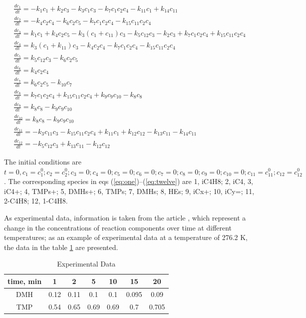 \documentclass{svproc}
\begin{document}
\begin{gather}
  \frac{dc_1}{dt} = -k_1c_1 + k_2c_3 - k_3c_1c_3 - k_7c_1c_2c_4 - k_{11}c_1 + k_{14}c_{11} \label{eq:one} \\
  \frac{dc_2}{dt} = -k_4c_2c_4 - k_6c_2c_5 - k_7c_1c_2c_4 - k_{15}c_{11}c_2c_4 \label{eq:two} \\
  \frac{dc_3}{dt} = k_1c_1 + k_4c_2c_5 - k_3(c_1 + c_{11})c_3 - k_{5}c_{12}c_3 - k_2c_3 + k_7c_1c_2c_4 + k_{15}c_{11}c_2c_4 \label{eq:three} \\
  \frac{dc_4}{dt} = k_3(c_1 + k_{11})c_3 - k_4c_2c_4 - k_{7}c_{1}c_2c_4 - k_{15}c_{11}c_2c_4 \label{eq:four} \\
  \frac{dc_5}{dt} = k_5c_{12}c_3 - k_{6}c_2c_5 \label{eq:five} \\
  \frac{dc_6}{dt} = k_4c_{2}c_4 \label{eq:six} \\
  \frac{dc_7}{dt} = k_6c_{2}c_5 - k_{10}c_7 \label{eq:seven} \\
  \frac{dc_8}{dt} = k_7c_{1}c_2c_4 + k_{15}c_{11}c_2c_4 + k_9c_9c_{10} - k_8c_8 \label{eq:eight} \\
  \frac{dc_9}{dt} = k_8c_{8} - k_{9}c_{9}c_{10} \label{eq:nine} \\
  \frac{dc_{10}}{dt} = k_8c_{8} - k_{9}c_{9}c_{10} \label{eq:ten} \\
  \frac{dc_{11}}{dt} = -k_3c_{11}c_3 - k_{15}c_{11}c_{2}c_4 + k_{11}c_1 + k_{12}c_{12} - k_{13}c_{11} - k_{14}c_{11} \label{eq:eleven} \\
  \frac{dc_{12}}{dt} = -k_5c_{12}c_3 + k_{13}c_{11} - k_{12}c_{12} \label{eq:twelve} 
\end{gather}

The initial conditions are $t = 0, c_1 = c_1^0; c_2=c_2^0; c_3 = 0; c_4 = 0; c_5= 0; c_6 = 0; c_7 = 0; c_8 = 0; c_9 = 0; c_{10} = 0; c_{11}=c_{11}^0; c_{12} = c_{12}^0$.
The corresponding species in eqs (\ref{eq:one})--(\ref{eq:twelve}) are 1, iC4H8; 2, iC4, 3, iC4+; 4, TMPs+; 5, DMHs+; 6, TMPs; 7, DMHs; 8, HEs; 9, iCx+; 10, iCy=; 11, 2-C4H8; 12, 1-C4H8.

As experimental data, information is taken from the article \cite{cao2019}, which represent a change in the concentrations of reaction components over time at different temperatures; as an example of experimental data at a temperature of 276.2 K, the data in the table \ref{table1} are presented.

\begin{table}
\label{table1}
\caption{Experimental Data}
\begin{center}
\begin{tabular}{ccccccc}
\hline
time, min & 1 & 2 & 5 & 10 & 15 & 20 \\
\hline\rule{0pt}{12pt}
DMH & 0.12 & 0.11 & 0.1	& 0.1 &	0.095 &	0.09  \\
TMP & 0.54 & 0.65 & 0.69 & 0.69 & 0.7 & 0.705 \\[2pt]
\hline
\end{tabular}
\end{center}
\end{table}
\end{document}
